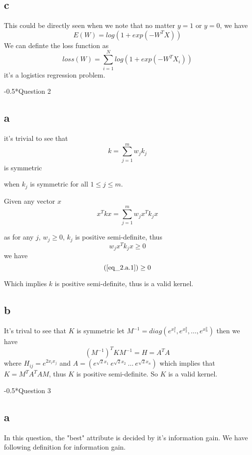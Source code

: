 \documentclass[12pt]{amsart}
\makeatletter
\renewcommand{\section}{\@startsection{section}{1}{0mm}
{-\baselineskip}{0.5\baselineskip}{\bf\leftline}}
\makeatother
\begin{document}
\subsection*{c}
This could be directly seen when we note that no matter $y=1$ or $y=0$, we have
$$
	E(W) = log(1 + exp(-W^TX)) 
$$
We can definte the loss function as
$$
	loss(W) = \sum_{i=1}^N log(1 + exp(-W^TX_i)) 
$$
it's a logistics regression problem.

\section*{Question 2}
\subsection*{a}
it's trivial to see that 
$$
	k = \sum_{j=1}^mw_jk_j 
$$
is symmetric 

when $k_j$ is symmetric for all $1 \leq j \leq m$.

Given any vector $x$
\begin{equation}
	\label{eq_2.a.1}
	x^Tkx = \sum_{j=1}^m w_jx^T k_j x
\end{equation}
	

as for any $j$, $w_j \geq 0$, $k_j$ is positive semi-definite,
thus 
$$
	w_jx^T k_j x \geq 0
$$
 we have
$$
	(\ref{eq_2.a.1}) \geq 0
$$

Which implies  $k$ is positive semi-definite, thus is a valid kernel.


\subsection*{b}
It's trival to see that $K$ is symmetric
let $M^{-1} = diag(e^{x_1^2}, e^{x_2^2}, \dots, e^{x_n^2})$
then we have
$$
	(M^{-1})^T K M^{-1} = H = A^T A
$$
where $H_{ij} = e^{2x_ix_j}$ and $A = (e^{\sqrt{2}x_1}~ e^{\sqrt{2}x_2}~ \ldots ~e^{\sqrt{2}x_n})$
which implies that $K = M^T A^T A M$, thus $K$ is positive semi-definite.
So $K$ is a valid kernel.



\section*{Question 3}
\subsection*{a}
In this question, the "best" attribute is decided by it's information gain. We have following definition
for information gain.
\end{document}
